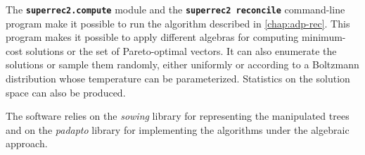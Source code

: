 The \textbf{\texttt{superrec2.compute}} module and the \texttt{\textbf{superrec2 reconcile}} command-line program make it possible to run the algorithm described in \cref{chap:adp-rec}.
This program makes it possible to apply different algebras for computing minimum-cost solutions or the set of Pareto-optimal vectors.
It can also enumerate the solutions or sample them randomly, either uniformly or according to a Boltzmann distribution whose temperature can be parameterized.
Statistics on the solution space can also be produced.

The software relies on the \emph{sowing} library for representing the manipulated trees and on the \emph{padapto} library for implementing the algorithms under the algebraic approach.
